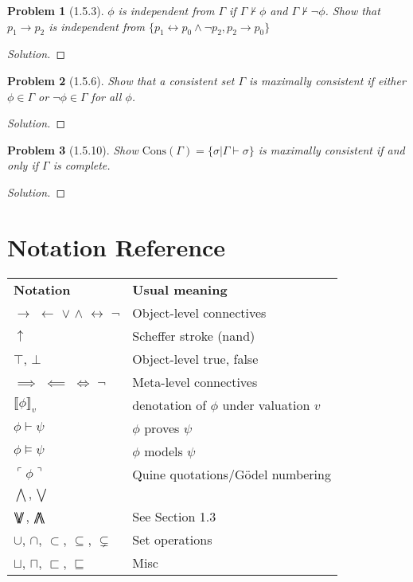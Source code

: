 \documentclass[letter]{article}
\newtheorem{problem}{Problem}
\theoremstyle{definition}
\newenvironment{solution}
{\begin{proof}[Solution]}
	{\end{proof}}
\DeclareMathOperator*{\bigdoublewedge}{\bigwedge\mkern-15mu\bigwedge}
\DeclareMathOperator*{\bigdoublevee}{\bigvee\mkern-15mu\bigvee}
\begin{document}
\begin{problem}[1.5.3] $\phi$ is \textit{independent} from $\Gamma$ if
    $\Gamma \not \vdash \phi$ and $\Gamma \not \vdash \neg \phi$. Show that $p_1 \to p_2$ is independent from $\{p_1 \leftrightarrow p_0 \land \neg p_2, p_2 \to p_0\}$
\end{problem}
\begin{solution}
\end{solution}

\begin{problem}[1.5.6] Show that a consistent set $\Gamma$ is maximally consistent if either $\phi \in \Gamma$ or $\neg \phi \in \Gamma$ for all $\phi$.
\end{problem}
\begin{solution}
\end{solution}


\begin{problem}[1.5.10] Show $\textrm{Cons}(\Gamma) = \{ \sigma | \Gamma \vdash \sigma \}$ is maximally consistent if and only if $\Gamma$ is complete.
\end{problem}
\begin{solution}
\end{solution}


\section{Notation Reference}

\begin{table}[H]
    \begin{tabular}{ll}
        \textbf{Notation} & \textbf{Usual meaning} \\
        $\to$ $\leftarrow$ $\lor$ $\land$ $\leftrightarrow$ $\neg$ & Object-level connectives \\
        $\uparrow$ & Scheffer stroke (nand)\\
        $\top$, $\bot$ & Object-level true, false \\
        $\implies$ $\impliedby$ $\iff$ $\neg$ & Meta-level connectives \\

        $\llbracket \phi \rrbracket_v$ & denotation of $\phi$ under valuation $v$\\
        $\phi \vdash \psi$ & $\phi$ proves $\psi$ \\
        $\phi \models \psi$ & $\phi$ models $\psi$ \\
        $\ulcorner \phi \urcorner$ & Quine quotations/G\"odel numbering \\
        $\bigwedge, \bigvee$ & \\
        $\bigdoublevee$, $\bigdoublewedge$ & See Section 1.3 \\
        $\cup$, $\cap$, $\subset$, $\subseteq$, $\subsetneq$ & Set operations \\
        $\sqcup$, $\sqcap$, $\sqsubset$, $\sqsubseteq$ & Misc \\
\end{tabular}
\end{table}
\end{document}
